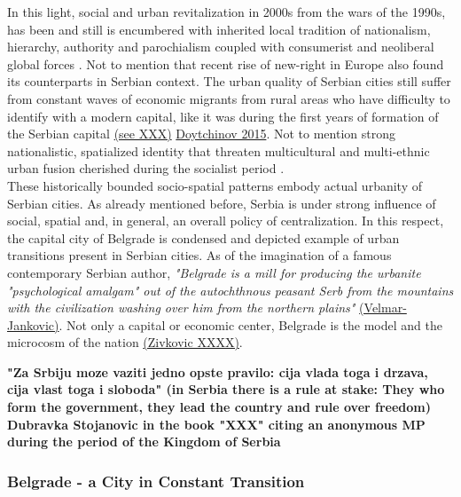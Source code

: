 \documentclass[11pt]{report}
\begin{document}
In this light, social and urban revitalization in 2000s from the wars of the 1990s, has been and still is encumbered with inherited local tradition of nationalism, hierarchy, authority and parochialism coupled with consumerist and neoliberal global forces \href{ref}{\citealt{stupar_aleksandra_recreating_2004}}.
Not to mention that recent rise of new-right in Europe also found its counterparts in Serbian context.
The urban quality of Serbian cities still suffer from constant waves of economic migrants from rural areas who have difficulty to identify with a modern capital, like it was during the first years of formation of the Serbian capital \href{ref}{(see XXX)} \href{ref}{Doytchinov 2015}. Not to mention strong nationalistic, spatialized identity \href{ref}{\citealt{savic_where_2014}} that threaten multicultural and multi-ethnic urban fusion cherished during the socialist period \href{ref}{\citealt{stupar_aleksandra_recreating_2004}}.
\\
These historically bounded socio-spatial patterns embody actual urbanity of Serbian cities. As already mentioned before, Serbia is under strong influence of social, spatial and, in general, an overall policy of centralization. In this respect, the capital city of Belgrade is condensed and depicted example of urban transitions present in Serbian cities.
As of the imagination of a famous contemporary Serbian author, \textit{"Belgrade is a mill for producing the urbanite "psychological amalgam" out of the autochthnous peasant Serb from the mountains with the civilization washing over him from the northern plains"} \href{ref}{(Velmar-Jankovic)}. Not only a capital or economic center, Belgrade is the model and the microcosm of the nation \href{ref}{(Zivkovic XXXX)}.

\textbf{"Za Srbiju moze vaziti jedno opste pravilo: cija vlada toga i drzava, cija vlast toga i sloboda" (in Serbia there is a rule at stake: They who form the government, they lead the country and rule over freedom) Dubravka Stojanovic in the book "XXX" citing an anonymous MP during the period of the Kingdom of Serbia}

\subsubsection{Belgrade - a City in Constant Transition}
\end{document}
